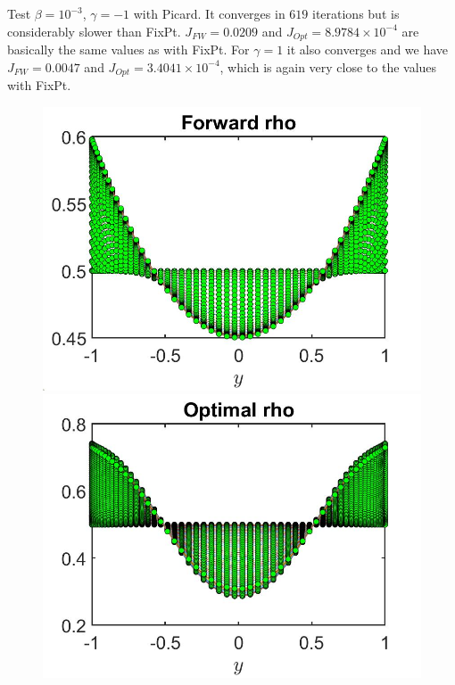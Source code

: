 \documentclass[11pt, a4paper]{article}
\theoremstyle{definition}
\begin{document}
Test $\beta = 10^{-3}$, $\gamma = -1$ with Picard. It converges in $619$ iterations but is considerably slower than FixPt. $J_{FW} = 0.0209$ and $J_{Opt} = 8.9784 \times 10^{-4}$ are basically the same values as with FixPt. For $\gamma = 1$ it also converges and we have $J_{FW} = 0.0047$ and $J_{Opt} = 3.4041 \times 10^{-4}$, which is again very close to the values with FixPt.

\begin{figure}[h]
	\includegraphics[scale=0.3]{rhoFWt.jpg}	\includegraphics[scale=0.3]{rhoOptt.jpg}

\end{figure}
\end{document}
